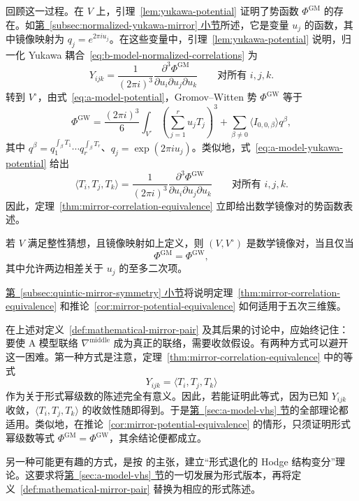 回顾这一过程。在 $V$ 上，引理~\ref{lem:yukawa-potential} 证明了势函数 $\Phi^{\mathrm{GM}}$ 的存在。如\hyperref[subsec:normalized-yukawa-mirror]{第~\ref*{subsec:normalized-yukawa-mirror} 小节}所述，它是变量 $u_j$ 的函数，其中镜像映射为 $q_j=e^{2\pi iu_j}$。在这些变量中，引理~\ref{lem:yukawa-potential} 说明，归一化 Yukawa 耦合~\eqref{eq:b-model-normalized-correlations} 为
\begin{equation}\label{eq:b-model-potential-correlations}
Y_{ijk}=\frac1{(2\pi i)^3}\frac{\partial^3\Phi^{\mathrm{GM}}}{\partial u_i\partial u_j\partial u_k}
\qquad\text{对所有 }i,j,k.
\end{equation}
转到 $V^\circ$，由式~\eqref{eq:a-model-potential}，Gromov--Witten 势 $\Phi^{\mathrm{GW}}$ 等于
\[
\Phi^{\mathrm{GW}}=\frac{(2\pi i)^3}{6}\int_{V^\circ}\left(\sum_{j=1}^ru_jT_j\right)^3
+\sum_{\beta\ne0}\langle I_{0,0,\beta}\rangle q^\beta,
\]
其中 $q^\beta=q_1^{\int_\beta T_1}\cdots q_r^{\int_\beta T_r}$、$q_j=\exp(2\pi iu_j)$。类似地，式~\eqref{eq:a-model-yukawa-potential} 给出
\[
\langle T_i,T_j,T_k\rangle=\frac1{(2\pi i)^3}\frac{\partial^3\Phi^{\mathrm{GW}}}{\partial u_i\partial u_j\partial u_k}
\qquad\text{对所有 }i,j,k.
\]
因此，定理~\ref{thm:mirror-correlation-equivalence} 立即给出数学镜像对的势函数表述。
\begin{corollary}\label{cor:mirror-potential-equivalence}
若 $V$ 满足整性猜想，且镜像映射如上定义，则 $(V,V^\circ)$ 是数学镜像对，当且仅当
\[
\Phi^{\mathrm{GM}}=\Phi^{\mathrm{GW}},
\]
其中允许两边相差关于 $u_j$ 的至多二次项。
\end{corollary}
\hyperref[subsec:quintic-mirror-symmetry]{第~\ref*{subsec:quintic-mirror-symmetry} 小节}将说明定理~\ref{thm:mirror-correlation-equivalence} 和推论~\ref{cor:mirror-potential-equivalence} 如何适用于五次三维簇。

在上述对定义~\ref{def:mathematical-mirror-pair} 及其后果的讨论中，应始终记住：要使 A 模型联络 $\nabla^{\mathrm{middle}}$ 成为真正的联络，需要收敛假设。有两种方式可以避开这一困难。第一种方式是注意，定理~\ref{thm:mirror-correlation-equivalence} 中的等式
\[
Y_{ijk}=\langle T_i,T_j,T_k\rangle
\]
作为关于形式幂级数的陈述完全有意义。因此，若能证明此等式，因为已知 $Y_{ijk}$ 收敛，$\langle T_i,T_j,T_k\rangle$ 的收敛性随即得到。于是\hyperref[sec:a-model-vhs]{第~\ref*{sec:a-model-vhs} 节}的全部理论都适用。类似地，在推论~\ref{cor:mirror-potential-equivalence} 的情形，只须证明形式幂级数等式 $\Phi^{\mathrm{GM}}=\Phi^{\mathrm{GW}}$，其余结论便都成立。

另一种可能更有趣的方式，是按  的主张，建立“形式退化的 Hodge 结构变分”理论。这要求将\hyperref[sec:a-model-vhs]{第~\ref*{sec:a-model-vhs} 节}的一切发展为形式版本，再将定义~\ref{def:mathematical-mirror-pair} 替换为相应的形式陈述。

